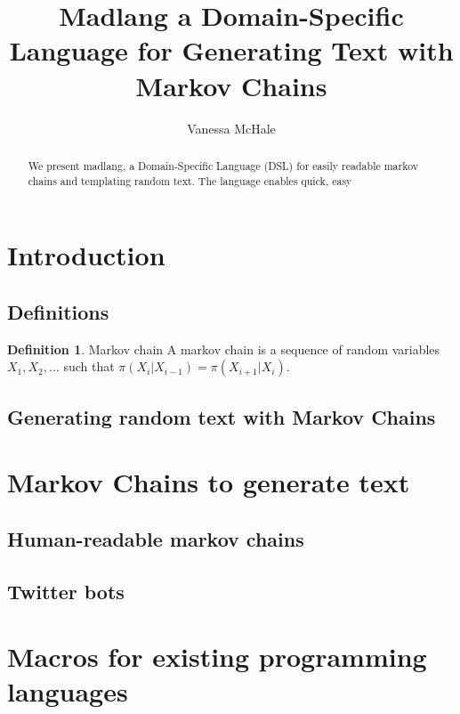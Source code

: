 \documentclass{article}
\theoremstyle{definition}
\newtheorem{definition}{Definition}[section]
\theoremstyle{plain}
\begin{document}
\title{Madlang \textendash{} a Domain-Specific Language for Generating Text with Markov Chains}
\author{Vanessa McHale}
\maketitle

\begin{abstract}
    We present madlang, a Domain-Specific Language (DSL) for easily readable markov chains and templating
    random text. The language enables quick, easy %
\end{abstract}

\tableofcontents

\section{Introduction}

\subsection{Definitions}

\theoremstyle{definition}
\begin{definition}{Markov chain}
    A markov chain is a sequence of random variables $X_1,X_2,\ldots$ such
    that $\pi(X_i|X_{i-1})=\pi(X_{i+1}|X_i)$. 
\end{definition}

\subsection{Generating random text with Markov Chains}


\section{Markov Chains to generate text}

\subsection{Human-readable markov chains}

\subsection{Twitter bots}

\section{Macros for existing programming languages}
\end{document}
